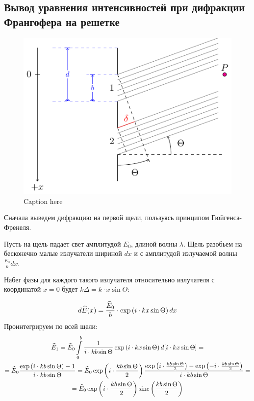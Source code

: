 \subsection{Вывод уравнения интенсивностей при дифракции Франгофера на решетке}

\begin{figure}[H]
	\centering
	\includegraphics[]{ris/diff}
	\caption{Caption here}
	\label{fig:figure1}
\end{figure}

Сначала выведем дифракцию на первой щели, пользуясь принципом Гюйгенса-Френеля. 

Пусть на щель падает свет амплитудой $E_0$, длиной волны $\lambda$.  Щель разобьем на бесконечно малые излучатели шириной $dx$ и с амплитудой излучаемой волны $\frac{E_0}{b}dx$.  

Набег фазы для каждого такого излучателя относительно излучателя с координатой $x=0$ будет $k\Delta=k\cdot x \sin\Theta$:

\begin{equation}
	d\widehat{E}(x)=\frac{\widehat{E}_0}{b}\cdot\exp\left(i\cdot k x \sin\Theta\right) dx
\end{equation}
Проинтегрируем по всей щели:
\begin{gather}
	\widehat{E}_{1}=\widehat{E}_0\int\limits_0^b \frac{1}{i\cdot kb\sin\Theta} \exp\left(i\cdot k x \sin\Theta\right) d[i\cdot k x \sin\Theta]=\\=
	\widehat{E}_0 \frac{\exp\left(i\cdot k b \sin\Theta\right)-1}{i\cdot kb\sin\Theta}=
	\widehat{E}_0\exp\left(i\cdot \frac{k b \sin\Theta}{2}\right) \frac{\exp\left(i\cdot \frac{k b \sin\Theta}{2}\right)-\exp\left(-i\cdot \frac{k b \sin\Theta}{2}\right)}{i\cdot kb\sin\Theta}=\\=
	\widehat{E}_0\exp\left(i\cdot \frac{k b \sin\Theta}{2}\right) \operatorname{sinc}\left(\frac{k b \sin\Theta}{2}\right)
\end{gather}

